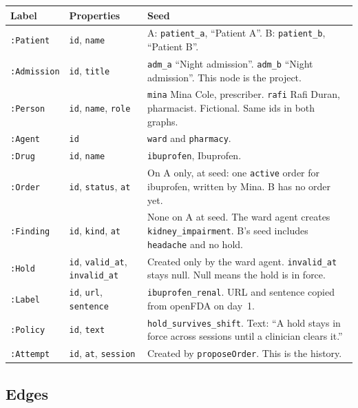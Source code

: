 \documentclass[11pt,a4paper]{article}
\newcommand{\code}[1]{\texttt{#1}}
\begin{document}
\begin{center}
\begin{tabularx}{\textwidth}{@{}lXX@{}}
\toprule
\textbf{Label} & \textbf{Properties} & \textbf{Seed} \\
\midrule
\code{:Patient} & \code{id}, \code{name} &
A: \code{patient\_a}, ``Patient A''. B: \code{patient\_b}, ``Patient B''. \\
\code{:Admission} & \code{id}, \code{title} &
\code{adm\_a} ``Night admission''. \code{adm\_b} ``Night admission''. This node is the project. \\
\code{:Person} & \code{id}, \code{name}, \code{role} &
\code{mina} Mina Cole, prescriber. \code{rafi} Rafi Duran, pharmacist. Fictional. Same ids in both graphs. \\
\code{:Agent} & \code{id} &
\code{ward} and \code{pharmacy}. \\
\code{:Drug} & \code{id}, \code{name} &
\code{ibuprofen}, Ibuprofen. \\
\code{:Order} & \code{id}, \code{status}, \code{at} &
On A only, at seed: one \code{active} order for ibuprofen, written by Mina. B has no order yet. \\
\code{:Finding} & \code{id}, \code{kind}, \code{at} &
None on A at seed. The ward agent creates \code{kidney\_impairment}. B's seed includes \code{headache} and no hold. \\
\code{:Hold} & \code{id}, \code{valid\_at}, \code{invalid\_at} &
Created only by the ward agent. \code{invalid\_at} stays null. Null means the hold is in force. \\
\code{:Label} & \code{id}, \code{url}, \code{sentence} &
\code{ibuprofen\_renal}. URL and sentence copied from openFDA on day~1. \\
\code{:Policy} & \code{id}, \code{text} &
\code{hold\_survives\_shift}. Text: ``A hold stays in force across sessions until a clinician clears it.'' \\
\code{:Attempt} & \code{id}, \code{at}, \code{session} &
Created by \code{proposeOrder}. This is the history. \\
\bottomrule
\end{tabularx}
\end{center}

\subsection{Edges}
\end{document}
